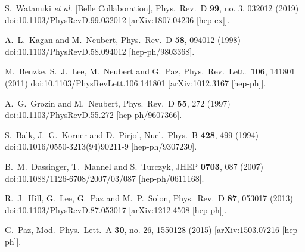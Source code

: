 \begin{thebibliography}{99}
  S.~Watanuki {\it et al.} [Belle Collaboration],
  Phys.\ Rev.\ D {\bf 99}, no. 3, 032012 (2019)
  doi:10.1103/PhysRevD.99.032012
  [arXiv:1807.04236 [hep-ex]].
  
  A.~L.~Kagan and M.~Neubert,
  Phys.\ Rev.\ D {\bf 58}, 094012 (1998)
  doi:10.1103/PhysRevD.58.094012
  [hep-ph/9803368].
  
  M.~Benzke, S.~J.~Lee, M.~Neubert and G.~Paz,
  Phys.\ Rev.\ Lett.\  {\bf 106}, 141801 (2011)
  doi:10.1103/PhysRevLett.106.141801
  [arXiv:1012.3167 [hep-ph]].
  
  A.~G.~Grozin and M.~Neubert,
  Phys.\ Rev.\ D {\bf 55}, 272 (1997)
  doi:10.1103/PhysRevD.55.272
  [hep-ph/9607366].
  
  S.~Balk, J.~G.~Korner and D.~Pirjol,
  Nucl.\ Phys.\ B {\bf 428}, 499 (1994)
  doi:10.1016/0550-3213(94)90211-9
  [hep-ph/9307230].
  
  B.~M.~Dassinger, T.~Mannel and S.~Turczyk,
  JHEP {\bf 0703}, 087 (2007)
  doi:10.1088/1126-6708/2007/03/087
  [hep-ph/0611168].
   
  
  
  R.~J.~Hill, G.~Lee, G.~Paz and M.~P.~Solon,
  Phys.\ Rev.\ D {\bf 87}, 053017 (2013)
  doi:10.1103/PhysRevD.87.053017
  [arXiv:1212.4508 [hep-ph]].
  
 G.~Paz,
  Mod.\ Phys.\ Lett.\ A {\bf 30}, no. 26, 1550128 (2015)
  [arXiv:1503.07216 [hep-ph]].
  

\end{thebibliography}
